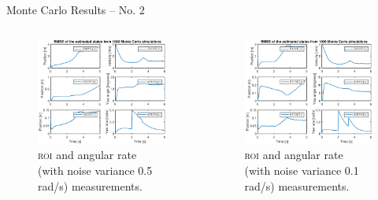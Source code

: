 \documentclass{beamer}
\newcommand{\roi}{\textsc{roi}\xspace}
\begin{document}
\begin{frame}{Monte Carlo Results -- No. 2}
	\begin{columns}[T]
	\begin{figure}
		\includegraphics[width=\textwidth]{MC/24_MC_1000_Rmse}
		\caption{\roi and angular rate (with noise variance 0.5 rad/s) measurements.}
	\end{figure}
	\begin{figure}
		\includegraphics[width=\textwidth]{MC/23_MC_1000_Rmse}
		\caption{\roi and angular rate (with noise variance 0.1 rad/s) measurements.}
	\end{figure}
	\end{columns}
\end{frame}
\end{document}
